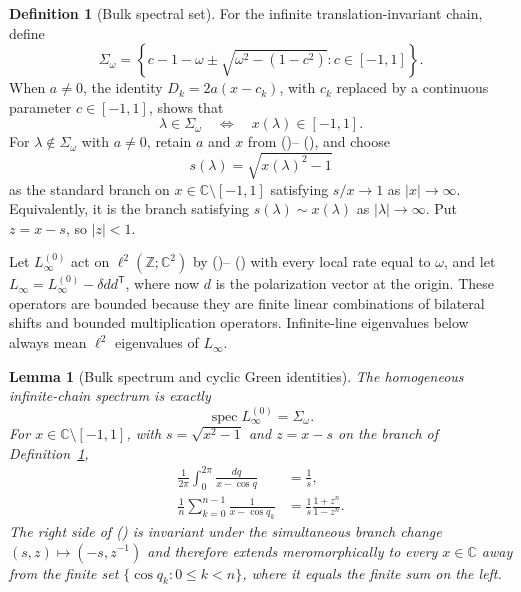 \documentclass[twoside,10pt]{article}
\numberwithin{equation}{section}
\theoremstyle{slbody}
\newtheorem{lemma}[theorem]{Lemma}
\theoremstyle{definition}
\newtheorem{definition}[theorem]{Definition}
\theoremstyle{remark}
\newcommand{\Z}{\mathbb Z}
\newcommand{\C}{\mathbb C}
\newcommand{\spec}{\operatorname{spec}}
\renewcommand{\eqref}[1]{%
  \textup{{\normalfont(\oldstylenums{\ref{#1}}}\normalfont)}}
\begin{document}
\begin{definition}[Bulk spectral set]\label{def:bulk-set}
For the infinite translation-invariant chain, define
\[
 \Sigma_\omega=
 \left\{c-1-\omega\pm\sqrt{\omega^2-(1-c^2)}:
              c\in[-1,1]\right\}.
\]
When $a\ne0$, the identity $D_k=2a(x-c_k)$, with $c_k$ replaced by a
continuous parameter $c\in[-1,1]$, shows that
\begin{equation}\label{eq:bulk-x-equivalence}
 \lambda\in\Sigma_\omega\quad\Longleftrightarrow\quad
 x(\lambda)\in[-1,1].
\end{equation}
For $\lambda\notin\Sigma_\omega$ with $a\ne0$, retain $a$ and $x$ from
\eqref{eq:a-def}--\eqref{eq:x-def}, and choose
\[
 s(\lambda)=\sqrt{x(\lambda)^2-1}
\]
as the standard branch on $x\in\C\setminus[-1,1]$ satisfying
$s/x\to1$ as $|x|\to\infty$.  Equivalently, it is the branch satisfying
$s(\lambda)\sim x(\lambda)$ as $|\lambda|\to\infty$.  Put $z=x-s$, so
$|z|<1$.

Let $L_\infty^{(0)}$ act on $\ell^2(\Z;\C^2)$ by
\eqref{eq:generator-plus}--\eqref{eq:generator-minus} with every local
rate equal to $\omega$, and let
$L_\infty=L_\infty^{(0)}-\delta dd^{\mathsf T}$, where now $d$ is the
polarization vector at the origin.  These operators are bounded because
they are finite linear combinations of bilateral shifts and bounded
multiplication operators.  Infinite-line eigenvalues below always mean
$\ell^2$ eigenvalues of $L_\infty$.
\end{definition}

\begin{lemma}[Bulk spectrum and cyclic Green identities]
\label{lem:green-identities}
The homogeneous infinite-chain spectrum is exactly
\[
 \spec L_\infty^{(0)}=\Sigma_\omega.
\]
For $x\in\C\setminus[-1,1]$, with $s=\sqrt{x^2-1}$ and $z=x-s$ on
the branch of Definition~\ref{def:bulk-set},
\begin{align}
 \frac1{2\pi}\int_0^{2\pi}\frac{dq}{x-\cos q}
   &=\frac1s,\label{eq:green-circle-integral}\\
 \frac1n\sum_{k=0}^{n-1}\frac1{x-\cos q_k}
   &=\frac1s\frac{1+z^n}{1-z^n}.
   \label{eq:green-root-unity}
\end{align}
The right side of \eqref{eq:green-root-unity} is invariant under the
simultaneous branch change $(s,z)\mapsto(-s,z^{-1})$ and therefore
extends meromorphically to every $x\in\C$ away from the finite set
$\{\cos q_k:0\le k<n\}$, where it equals the finite sum on the left.
\end{lemma}
\end{document}
